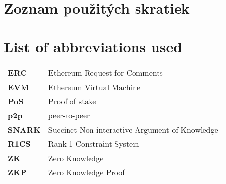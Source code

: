 \thispagestyle{plain}

\ifx\FIITlagEN\undefined
    \section*{\Huge Zoznam použitých skratiek}
\else
    \section*{\Huge List of abbreviations used}
\fi
\vskip 1cm

\begin{tabular}{ >{\bfseries}m{2cm} m{10cm} }
	ERC & Ethereum Request for Comments \\
	EVM & Ethereum Virtual Machine 	\\
	PoS & Proof of stake \\
	p2p & peer-to-peer \\
	SNARK & Succinct Non-interactive Argument of Knowledge \\
	R1CS & Rank-1 Constraint System \\
	ZK  & Zero Knowledge           	\\
	ZKP & Zero Knowledge Proof
\end{tabular}

\emptypage
